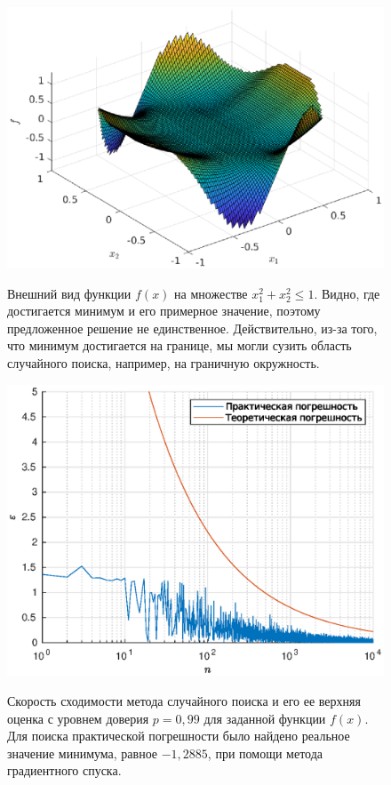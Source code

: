 \begin{figure}[b]
        \noindent
        \centering
        {
                \includegraphics[width=120mm]{task_07/f_func.eps}
        }
        \caption{Внешний вид функции $f(x)$ на множестве $x_1^2 + x_2^2 \leqslant 1$. Видно, где достигается минимум и его примерное значение, поэтому предложенное решение не единственное. Действительно, из-за того, что минимум достигается на границе, мы могли сузить область случайного поиска, например, на граничную окружность.}
\end{figure}
\clearpage
\begin{figure}[t]
        \noindent
        \centering
        {
                \includegraphics[width=120mm]{task_07/speed.eps}
        }
        \caption{Скорость сходимости метода случайного поиска и его ее верхняя оценка с уровнем доверия $p = 0,\!99$ для заданной функции $f(x)$. Для поиска практической погрешности было найдено реальное значение минимума, равное $-1,\!2885$, при помощи метода градиентного спуска.}
\end{figure}
